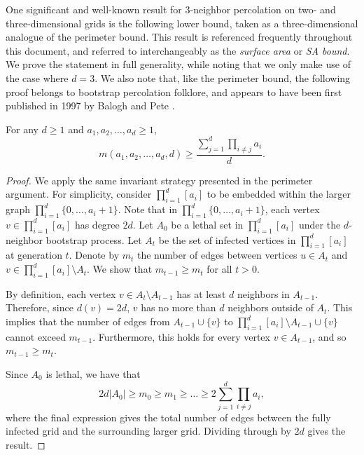 One significant and well-known result for 3-neighbor percolation on two- and three-dimensional grids is the following lower bound, taken as a three-dimensional analogue of the perimeter bound. This result is referenced frequently throughout this document, and referred to interchangeably as the \emph{surface area} or \emph{SA bound}. We prove the statement in full generality, while noting that we only make use of the case where $d=3$. We also note that, like the perimeter bound, the following proof belongs to bootstrap percolation folklore, and appears to have been first published in 1997 by Balogh and Pete \cite{balogh_and_pete}.

\begin{thm}
\label{thm:sa_bound}
For any $d \geq 1$ and $a_1, a_2, \dots, a_d \geq 1$, 
$$m(a_1,a_2, \dots, a_d,d) \geq \frac{\sum_{j=1}^d \prod_{i \neq j} a_i}{d}.$$
\end{thm}

\begin{proof}
We apply the same invariant strategy presented in the perimeter argument. For simplicity, consider $\prod_{i=1}^d[a_i]$ to be embedded within the larger graph $\prod_{i=1}^d \{0, \dots, a_i + 1\}$. Note that in $\prod_{i=1}^d \{0, \dots, a_i + 1\}$, each vertex $v \in \prod_{i=1}^d[a_i]$ has degree $2d$. Let $A_0$ be a lethal set in $\prod_{i=1}^d[a_i]$ under the $d$-neighbor bootstrap process. Let $A_t$ be the set of infected vertices in $\prod_{i=1}^d[a_i]$ at generation $t$. Denote by $m_t$ the number of edges between vertices $u \in A_t$ and $v \in \prod_{i=1}^d[a_i] \setminus A_t$. %
We show that $m_{t-1} \geq m_t$ for all $t> 0$. 

By definition, each vertex $v \in A_t \setminus A_{t-1}$ has at least $d$ neighbors in $A_{t-1}$. Therefore, since $d(v) = 2d$, $v$ has no more than $d$ neighbors outside of $A_t$. This implies that the number of edges from $A_{t-1} \cup \{v\}$ to $\prod_{i=1}^d[a_i] \setminus A_{t-1} \cup \{v\}$ cannot exceed $m_{t-1}$. Furthermore, this holds for every vertex $v \in A_{t-1}$, and so $m_{t-1} \geq m_t$. 

Since $A_0$ is lethal, we have that 
$$2d|A_0| \geq m_0 \geq m_1 \geq \dots \geq 2 \sum_{j=1}^d \prod_{i \neq j} a_i,$$ 
where the final expression gives the total number of edges between the fully infected grid and the surrounding larger grid. Dividing through by $2d$ gives the result.
\end{proof}

